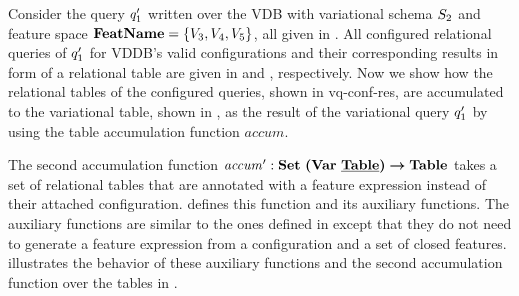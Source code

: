 

\begin{example}
\label{eg:acc-table-from-conf}
Consider the query $\VVal {\vQ_1}$ written over the VDB with variational schema $\vSch_2$ and 
feature space $\fSet = \setDef {\vThree, \vFour, \vFive}$, all given in . 
%
All configured relational queries of $\VVal {\vQ_1}$ for VDDB's valid configurations and their
corresponding results in form of a relational table are given
in  and , respectively. 
%
Now we show how the relational tables of the configured queries, shown in \tabref{}vq-conf-res, are accumulated 
to the variational table, shown in , as the result of the variational query $\VVal \vQ_1$ by 
using the table accumulation function $\mathit{accum}$.
%
\end{example}

The second accumulation function
 $\VVal {\mathit{accum}} :  \settype {\bm{(}\vartype \pTabSet\bm{)}} \totype \tabletype$ 
 takes a set of relational tables that are annotated with
a feature expression instead of their attached configuration.  defines
this function and its auxiliary functions. The auxiliary functions are similar to the ones
defined in  except that they do not need to generate a feature expression
from a configuration and a set of closed features.
%
 illustrates the behavior of these auxiliary functions and the second accumulation
function over the tables in .



\begin{example}
\label{eg:acc-table-from-group}
\end{example}